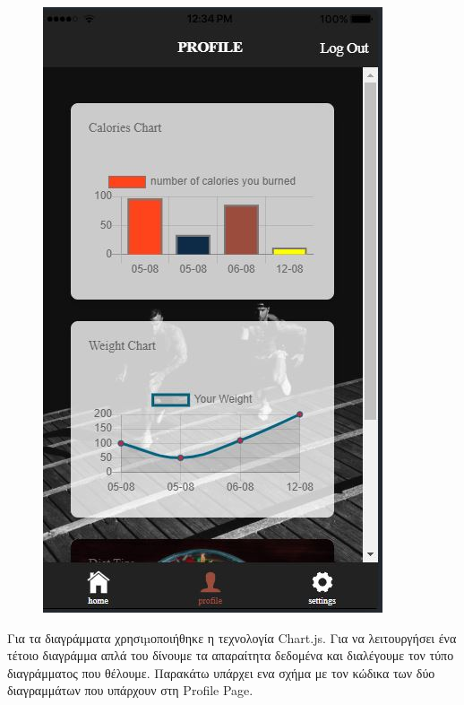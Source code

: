 \documentclass[a4paper,12pt]{article}
\begin{document}
\begin{figure}[!htb]
			\includegraphics[width=\linewidth]{profile5}
		  \endminipage\hfill
		
		\end{figure}
		\vspace*{1cm}

		Για τα διαγράμματα χρησιµοποιήθηκε η τεχνολογία Chart.js. Για να λειτουργήσει ένα τέτοιο διαγράμμα
		απλά του δίνουμε τα απαραίτητα δεδομένα και διαλέγουμε τον τύπο διαγράμματος που θέλουμε.
		Παρακάτω υπάρχει ενα σχήμα με τον κώδικα των δύο διαγραμμάτων που υπάρχουν στη Profile Page.
		\newpage
\end{document}
